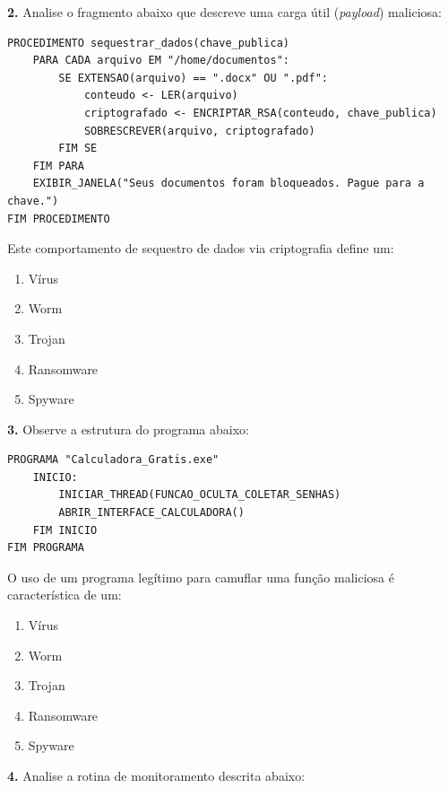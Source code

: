 \documentclass[12pt]{article}
\begin{document}
\vspace{0.5cm}

\noindent \textbf{2.} Analise o fragmento abaixo que descreve uma carga útil (\textit{payload}) maliciosa:

\begin{lstlisting}
PROCEDIMENTO sequestrar_dados(chave_publica)
    PARA CADA arquivo EM "/home/documentos":
        SE EXTENSAO(arquivo) == ".docx" OU ".pdf":
            conteudo <- LER(arquivo)
            criptografado <- ENCRIPTAR_RSA(conteudo, chave_publica)
            SOBRESCREVER(arquivo, criptografado)
        FIM SE
    FIM PARA
    EXIBIR_JANELA("Seus documentos foram bloqueados. Pague para a chave.")
FIM PROCEDIMENTO
\end{lstlisting}

Este comportamento de sequestro de dados via criptografia define um:
\begin{enumerate}[label=(\Alph*)]
    \item Vírus
    \item Worm
    \item Trojan
    \item Ransomware
    \item Spyware
\end{enumerate}

\vspace{0.5cm}

\noindent \textbf{3.} Observe a estrutura do programa abaixo:

\begin{lstlisting}
PROGRAMA "Calculadora_Gratis.exe"
    INICIO:
        INICIAR_THREAD(FUNCAO_OCULTA_COLETAR_SENHAS)
        ABRIR_INTERFACE_CALCULADORA()
    FIM INICIO
FIM PROGRAMA
\end{lstlisting}

O uso de um programa legítimo para camuflar uma função maliciosa é característica de um:
\begin{enumerate}[label=(\Alph*)]
    \item Vírus
    \item Worm
    \item Trojan
    \item Ransomware
    \item Spyware
\end{enumerate}

\vspace{0.5cm}

\noindent \textbf{4.} Analise a rotina de monitoramento descrita abaixo:
\end{document}
